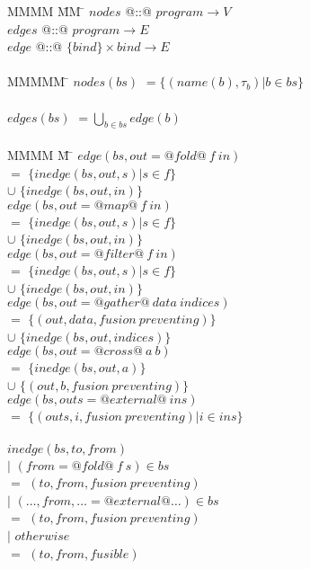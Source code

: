 \begin{tabbing}
MMMM        \= MM   \= \kill
$nodes$     \> @::@ \> $program \to V$          \\
$edges$     \> @::@ \> $program \to E$          \\
$edge$      \> @::@ \> $\{bind\} \times bind \to E$\\
\\
MMMMM       \= \kill
$nodes(bs)$ \> $= \{(name(b), \tau_b) | b \in bs\}$       \\
\\
$edges(bs)$ \> $= \bigcup_{b \in bs}edge(b)$    \\
\\
MMMM             \= M \= \kill
$edge(bs, out = @fold@~f~in)$ \\
                              \> $=$    \> $\{inedge(bs,out,s) | s \in f\}$ \\
                              \> $\cup$ \> $\{inedge(bs, out, in) \}$       \\
$edge(bs, out = @map@~f~in)$  \\
                              \> $=$    \> $\{inedge(bs,out,s) | s \in f\}$ \\
                              \> $\cup$ \> $\{inedge(bs, out, in) \}$       \\
$edge(bs, out = @filter@~f~in)$  \\
                              \> $=$    \> $\{inedge(bs,out,s) | s \in f\}$ \\
                              \> $\cup$ \> $\{inedge(bs, out, in) \}$       \\
$edge(bs, out = @gather@~data~indices)$  \\
                              \> $=$    \> $\{(out,data, fusion~preventing) \}$ \\
                              \> $\cup$ \> $\{inedge(bs, out, indices) \}$       \\
$edge(bs, out = @cross@~a~b)$            \\
                              \> $=$    \> $\{inedge(bs, out, a) \}$       \\
                              \> $\cup$ \> $\{(out, b, fusion~preventing) \}$ \\
$edge(bs, outs = @external@~ins)$  \\
                              \> $=$    \> $\{(outs,i, fusion~preventing) | i \in ins \}$ \\
\\
$inedge(bs,to,from)$ \\
                     \> $|$ \> $(from = @fold@~f~s) \in bs$     \\
                     \> $=$ \> $(to, from, fusion~preventing)$  \\
                     \> $|$ \> $(\ldots,from,\ldots = @external@ \ldots) \in bs$     \\
                     \> $=$ \> $(to, from, fusion~preventing)$  \\
                     \> $|$ \> $otherwise$                      \\
                     \> $=$ \> $(to, from, fusible)$            \\
\end{tabbing}

